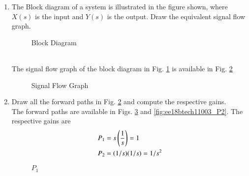 \begin{enumerate}[label=\thesubsection.\arabic*.,ref=\thesubsection.\theenumi]

\item The Block diagram of a system is illustrated in the figure shown, where $X(s)$ is the input and $Y(s)$ is the output.  Draw the equivalent signal flow graph. 
\renewcommand{\thefigure}{\theenumi.\arabic{figure}}
%
\begin{figure}[!ht]
    \begin{center}
		
		\resizebox{\columnwidth}{!}{}
	\end{center}
\caption{Block Diagram}
\label{fig:ee18btech11003_block_diagram}
\end{figure}
\\
\solution The signal flow graph of the block diagram in Fig. \ref{fig:ee18btech11003_block_diagram} is available in Fig. \ref{fig:ee18btech11003_signal_flow}
%
\begin{figure}[!ht]
\begin{center}
		
		\resizebox{\columnwidth}{!}{}
	\end{center}
\caption{Signal Flow Graph}
\label{fig:ee18btech11003_signal_flow}
\end{figure}
%
\renewcommand{\thefigure}{\theenumi}
\item Draw all the forward paths in Fig. \ref{fig:ee18btech11003_signal_flow}
and compute the respective gains.
\renewcommand{\thefigure}{\theenumi.\arabic{figure}}
\\
\solution The forward paths are available in Figs. \ref{fig:ee18btech11003_P1}
 and \ref{fig:ee18btech11003_P2}.  The respective gains are
\begin{align}
P_1&=s \left(\frac{1}{s}\right)=1
\\
P_2&=(1/s)(1/s)=1/s^2
\end{align}
%
\begin{figure}[!ht]
\begin{center}
		
		\resizebox{\columnwidth}{!}{}
	\end{center}
\caption{$P_1$}
\label{fig:ee18btech11003_P1}
\end{figure}
%
\begin{figure}[!ht]
\begin{center}
		

\end{center}
\end{figure}
\end{enumerate}
